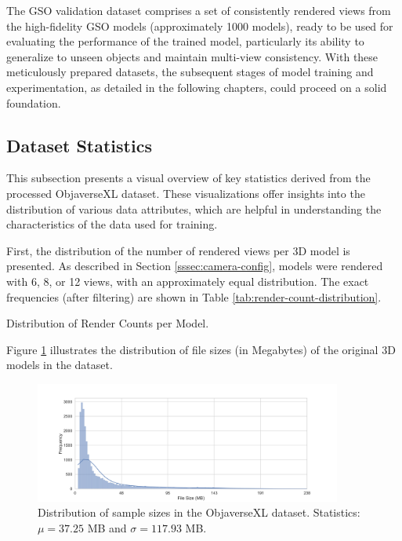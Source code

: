 The GSO validation dataset comprises a set of consistently rendered views from the high-fidelity GSO models (approximately 1000 models), ready to be used for evaluating the performance of the trained model, particularly its ability to generalize to unseen objects and maintain multi-view consistency.
With these meticulously prepared datasets, the subsequent stages of model training and experimentation, as detailed in the following chapters, could proceed on a solid foundation.

\subsection{Dataset Statistics}\label{ssec:dataset-statistics}
This subsection presents a visual overview of key statistics derived from the processed ObjaverseXL dataset. These visualizations offer insights into the distribution of various data attributes, which are helpful in understanding the characteristics of the data used for training.

First, the distribution of the number of rendered views per 3D model is presented. As described in Section \ref{sssec:camera-config}, models were rendered with 6, 8, or 12 views, with an approximately equal distribution. The exact frequencies (after filtering) are shown in Table \ref{tab:render-count-distribution}.

\begin{table}[h]
  \centering
  \caption{Distribution of Render Counts per Model.}
  \label{tab:render-count-distribution}
\end{table}

Figure \ref{fig:dist-file-size} illustrates the distribution of file sizes (in Megabytes) of the original 3D models in the dataset.

\begin{figure}[h]
  \centering
  \includegraphics[width=0.9\textwidth]{images/data/objaverse_visualizations/distribution_file_size_bytes.jpeg}
  \caption{Distribution of sample sizes in the ObjaverseXL dataset. Statistics: $\mu = 37.25$ MB and $\sigma = 117.93$ MB.}
  \label{fig:dist-file-size}
\end{figure}

